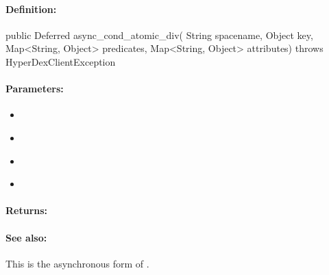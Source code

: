 \paragraph{Definition:}
\begin{javacode}
public Deferred async_cond_atomic_div(
        String spacename,
        Object key,
        Map<String, Object> predicates,
        Map<String, Object> attributes) throws HyperDexClientException
\end{javacode}

\paragraph{Parameters:}
\begin{itemize}[noitemsep]
\item {}\\

\item {}\\

\item {}\\

\item {}\\

\end{itemize}

\paragraph{Returns:}


\paragraph{See also:}  This is the asynchronous form of .

\pagebreak
\subsubsection{}
\label{api:java:group_atomic_mod}


